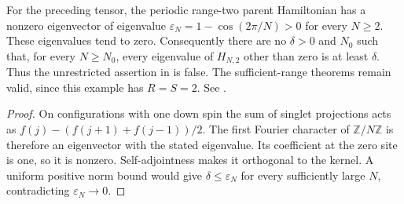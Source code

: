 \begin{lemma}
    \label{thm:short_range_parent_gap_counterexample}
    \leanok
    For the preceding tensor, the periodic range-two parent Hamiltonian
    has a nonzero eigenvector of eigenvalue
    $\varepsilon_N=1-\cos(2\pi/N)>0$ for every $N\geq2$.
    These eigenvalues tend to zero. Consequently there are no
    $\delta>0$ and $N_0$ such that, for every $N\geq N_0$, every eigenvalue
    of $H_{N,2}$ other than zero is at least $\delta$.
    Thus the unrestricted assertion in
    \cite[Section~IV.C, lines~2183--2187]{Cirac2021Matrix} is false.
    The sufficient-range theorems remain valid, since this example
    has $R=S=2$. See \cite{gap:cpgsv21_short_range_parent_gap}.
\end{lemma}

\begin{proof}
    \leanok
    On configurations with one down spin the sum of singlet projections
    acts as $f(j)-(f(j+1)+f(j-1))/2$. The first Fourier character of
    $\mathbb Z/N\mathbb Z$ is therefore an eigenvector with the stated
    eigenvalue. Its coefficient at the zero site is one, so it is nonzero.
    Self-adjointness makes it orthogonal to the kernel. A uniform positive
    norm bound would give $\delta\leq\varepsilon_N$ for every sufficiently
    large $N$, contradicting $\varepsilon_N\to0$.
\end{proof}

